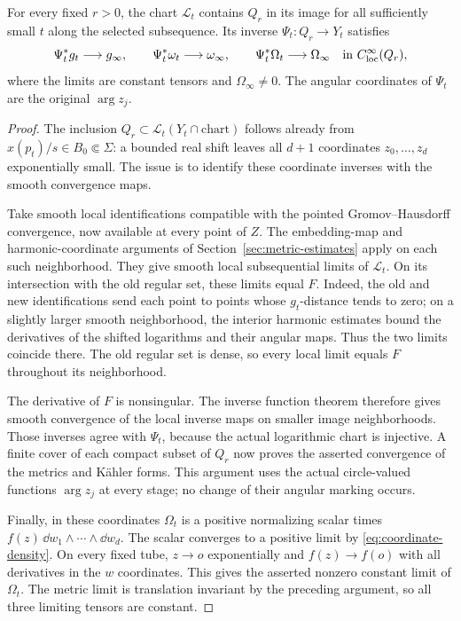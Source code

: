 \begin{lemma}
\label{lem:actual-log-convergence}
For every fixed $r>0$, the chart $\mathcal L_t$ contains $Q_r$ in its
image for all sufficiently small $t$ along the selected subsequence.
Its inverse $\Psi_t:Q_r\to Y_t$ satisfies
\[
 \Psi_t^*g_t\longrightarrow g_\infty,\qquad
 \Psi_t^*\omega_t\longrightarrow\omega_\infty,\qquad
 \Psi_t^*\Omega_t\longrightarrow\Omega_\infty
       \quad\hbox{in }C^\infty_{\mathrm{loc}}(Q_r),
\]
where the limits are constant tensors and $\Omega_\infty\ne0$.
The angular coordinates of $\Psi_t$ are the original $\arg z_j$.
\end{lemma}
\begin{proof}
The inclusion $Q_r\subset\mathcal L_t(Y_t\cap\text{chart})$ follows
already from $x(p_t)/s\in B_0\Subset\Sigma$: a bounded real shift leaves
all $d+1$ coordinates $z_0,\ldots,z_d$ exponentially small. The issue
is to identify these coordinate inverses with the smooth convergence
maps.

Take smooth local identifications compatible with the pointed
Gromov--Hausdorff convergence, now available at every point of $Z$.
The embedding-map and harmonic-coordinate arguments of
Section~\ref{sec:metric-estimates} apply on each such neighborhood.
They give smooth local subsequential limits of $\mathcal L_t$.
On its intersection with the old regular set, these limits equal $F$.
Indeed, the old and new identifications send each point to points
whose $g_t$-distance tends to zero; on a slightly larger smooth
neighborhood, the interior harmonic estimates bound the derivatives
of the shifted logarithms and their angular maps. Thus the two
limits coincide there. The old regular set is dense, so every local
limit equals $F$ throughout its neighborhood.

The derivative of $F$ is nonsingular. The inverse function theorem
therefore gives smooth convergence of the local inverse maps on
smaller image neighborhoods. Those inverses agree with $\Psi_t$,
because the actual logarithmic chart is injective. A finite cover
of each compact subset of $Q_r$ now proves the asserted convergence
of the metrics and K\"ahler forms. This argument uses the actual
circle-valued functions $\arg z_j$ at every stage; no change of their
angular marking occurs.

Finally, in these coordinates $\Omega_t$ is a positive normalizing
scalar times $f(z)\,\dd w_1\wedge\cdots\wedge\dd w_d$.
The scalar converges to a positive limit by
\eqref{eq:coordinate-density}. On every fixed tube, $z\to o$
exponentially and $f(z)\to f(o)$ with all derivatives in the $w$
coordinates. This gives the asserted nonzero constant limit of
$\Omega_t$. The metric limit is translation invariant by the
preceding argument, so all three limiting tensors are constant.
\end{proof}

